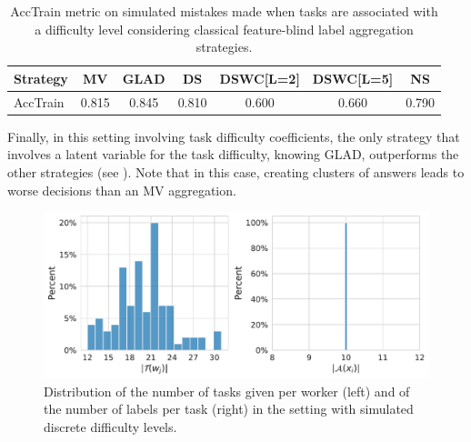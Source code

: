\begin{table}[htbp]
    \centering
    \caption{AccTrain metric on simulated mistakes made when tasks are associated with a difficulty level considering classical feature-blind label aggregation strategies.}
    \label{tab:accuracy_train_diff}
    \begin{tabular}{|l|c|c|c|c|c|c|}
    \hline
    \textbf{Strategy} & \textbf{MV} & \textbf{GLAD} & \textbf{DS} & \textbf{DSWC[L=2]} & \textbf{DSWC[L=5]} & \textbf{NS} \\
    \hline
    AccTrain & 0.815 &	0.845 &	0.810 &	0.600 &	0.660 &	0.790 \\
    \hline
    \end{tabular}
    \end{table}

Finally, in this setting involving task difficulty coefficients, the only strategy that involves a latent variable for the task difficulty, knowing GLAD, outperforms the other strategies (see ). Note that in this case, creating clusters of answers leads to worse decisions than an MV aggregation.

\begin{figure}[htbp]
    \centering
    \includegraphics[width=.8\textwidth]{./chapters/images_peerannot/cell-20-output-1.pdf}
    \caption{Distribution of the number of tasks given per worker (left) and of the number of labels per task (right) in the setting with simulated discrete difficulty levels.}
\end{figure}


